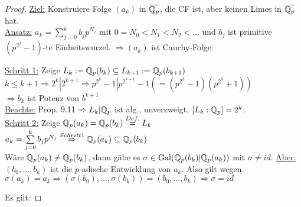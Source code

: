 
\begin{proof}
\underline{Ziel:} Konstruiere Folge $(a_k)$ in $\overline{\mathbb{Q}_p}$, die CF ist, aber keinen Limes in $\overline{\mathbb{Q}_p}$ hat.\\
\underline{Ansatz:} $a_k=\sum_{j=0}^k b_j p^{N_j}$ mit $0 = N_0 < N_1 < N_2 < \ldots$ und $b_j$ ist primitive $(p^{2^j}-1)$-te Einheitswurzel. $\Rightarrow (a_k)$ ist Cauchy-Folge.

\underline{Schritt 1:} Zeige $L_k:=\mathbb{Q}_p(b_k) \subseteq L_{k+1}:=\mathbb{Q}_p(b_{k+1})$\\
$k \leq k+1 \Rightarrow 2^k | 2^{k+1} \Rightarrow p^{2^k}-1|p^{2^{k+1}}-1(=(p^{2^k}-1)(p^{2^k}+1))$\\
$\Rightarrow b_k$ ist Potenz von $b^{k+1}$\\
\underline{Beachte:} Prop. 9.11 $\Rightarrow L_k |\mathbb{Q}_p$ ist alg., unverzweigt, $[L_k:\mathbb{Q}_p]=2^k$.\\
\underline{Schritt 2:} Zeige $\mathbb{Q}_p(a_k)=\mathbb{Q}_p(b_k)\stackrel{Def.}{=} L_k$\\
$a_k=\sum\limits_{j=0}^k b_j p^{N_j} \stackrel{Schritt 1}{\Rightarrow} \mathbb{Q}_p(a_k) \subseteq \mathbb{Q}_p(b_k)$\\
Wäre $\mathbb{Q}_p(a_k)\neq \mathbb{Q}_p(b_k)$, dann gäbe es $\sigma \in \operatorname{Gal}(\mathbb{Q}_p(b_k)|\mathbb{Q}_p(a_k))$ mit $\sigma \neq id$. \underline{Aber:} $(b_0, \dots, b_k)$ ist die $p$-adische Entwicklung von $a_k$. Also gilt wegen $\sigma(a_k)=a_k \Rightarrow (\sigma(b_0), \dots, \sigma(b_k))=(b_0,\dots, b_k) \Rightarrow \sigma=id $ \Lightning

Es gilt:


\end{proof}
